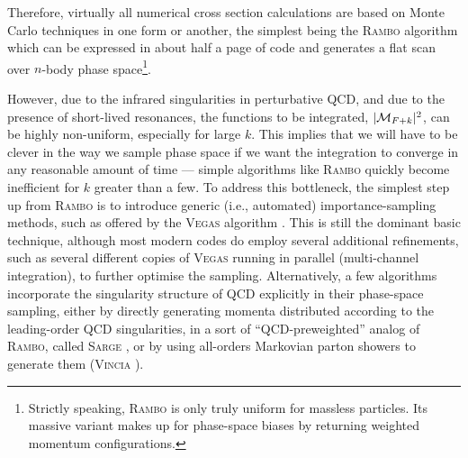 Therefore, virtually
all numerical cross section calculations are based on Monte Carlo
techniques in one form or another, the simplest being the 
%
%
\textsc{Rambo} algorithm \cite{Kleiss:1985gy} which can be expressed
in about half a page of code and generates a flat scan over $n$-body
phase space\footnote{Strictly speaking, \textsc{Rambo} is only truly
  uniform for massless particles. Its massive variant makes up for
  phase-space biases by returning weighted momentum configurations.}. 

%
However, due to 
the infrared singularities in perturbative QCD, and due to the
presence of short-lived resonances, the functions to be
integrated, $|{\cal{M}}_{F+k}|^2$, can be highly non-uniform,
especially for large $k$.
This implies that we will have to be clever in the way
we sample phase space if we want the integration to converge in any
%
reasonable amount of time --- simple algorithms like \textsc{Rambo} 
quickly become inefficient for $k$ greater than a few. 
To address this bottleneck, 
the simplest step up
from \textsc{Rambo} is to introduce generic (i.e., automated) 
importance-sampling methods, such as offered by the  
%
%
\textsc{Vegas} algorithm \cite{Lepage:1977sw,Lepage:1980dq}. This is still the
dominant basic technique, although most modern codes do employ several 
additional refinements, such as several different copies of \textsc{Vegas}
running in parallel (multi-channel integration), to further optimise
the sampling.  
Alternatively, a few algorithms incorporate the singularity structure of QCD
explicitly in their phase-space sampling, either by directly generating momenta
distributed according to the leading-order QCD singularities, in a
sort of ``QCD-preweighted'' analog of \textsc{Rambo}, called
%
%
\textsc{Sarge} \cite{Draggiotis:2000gm}, or by using all-orders
Markovian parton showers to generate them 
(\textsc{Vincia} \cite{Giele:2011cb,LopezVillarejo:2011ap,Fischer:2016vfv}).  


